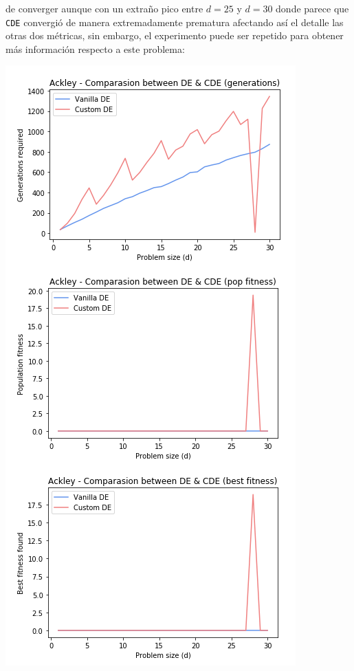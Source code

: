 \documentclass[10pt, letterpaper]{article}
\theoremstyle{definition}
\begin{document}
\begin{enumerate}
\begin{enumerate}
              de converger aunque con un extraño pico entre $d=25$ y $d=30$ donde
              parece que \texttt{CDE} convergió de manera extremadamente
              prematura afectando así el detalle las otras dos métricas, sin
              embargo, el experimento puede ser repetido para obtener más información
              respecto a este problema:
              \begin{center}
                \includegraphics[scale=0.6]{assets/ackley-compound.png}
              \end{center}

\end{enumerate}
\end{enumerate}
\end{document}
